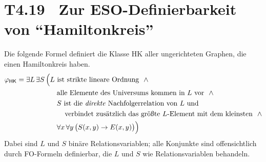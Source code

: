 \documentclass[fontsize=11pt, twoside=false, numbers=autoenddot]{scrbook}
\begin{document}
\section*{T4.19~ Zur ESO-Definierbarkeit von "`Hamiltonkreis"'}

Die folgende Formel definiert die Klasse HK aller ungerichteten Graphen, die einen Hamiltonkreis haben.
%
\begin{align*}
  \varphi_{\textsf{HK}} & = \exists L\,\exists S\,\Big(\text{$L$ ist strikte lineare Ordnung~} ~\land \\
                        & \hspace*{20mm} \text{alle Elemente des Universums kommen in $L$ vor~} ~\land \\
                        & \hspace*{20mm} \text{$S$ ist die \emph{direkte} Nachfolgerrelation von $L$ und} \\
                        & \hspace*{24mm} \text{verbindet zusätzlich das größte $L$-Element mit dem kleinsten~} ~\land \\
                        & \hspace*{20mm} \forall x\,\forall y\,\big(S(x,y) \to E(x,y)\big)\Big)
\end{align*}
%
Dabei sind $L$ und $S$ binäre Relationsvariablen;
alle Konjunkte sind offensichtlich durch FO-Formeln definierbar,
die $L$ und $S$ wie Relationsvariablen behandeln.
\end{document}
